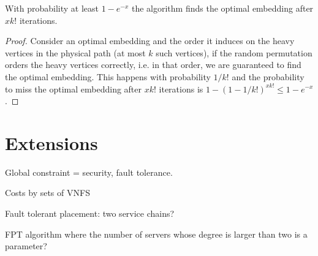 \documentclass[runningheads]{llncs}
\begin{document}
\begin{theorem}
With probability at least $1 - e^{-x}$ the algorithm finds the optimal embedding
after $xk!$ iterations.
\end{theorem}

\begin{proof}
Consider an optimal embedding and the order it induces on the heavy vertices in
the physical path (at most $k$ such vertices), if the random permutation orders
the heavy vertices correctly, i.e. in that order, we are guaranteed to find the
optimal embedding.
This happens with probability $1/k!$ and the probability to miss the optimal
embedding after $xk!$ iterations is $1 - (1 - 1/k!)^{xk!} \leq 1 - e^{-x}$.
\end{proof}


\section{Extensions}

Global constraint = security, fault tolerance.

Costs by sets of VNFS

Fault tolerant placement: two service chains?

FPT algorithm where the number of servers whose degree is larger than
two is a parameter?




\end{document}
